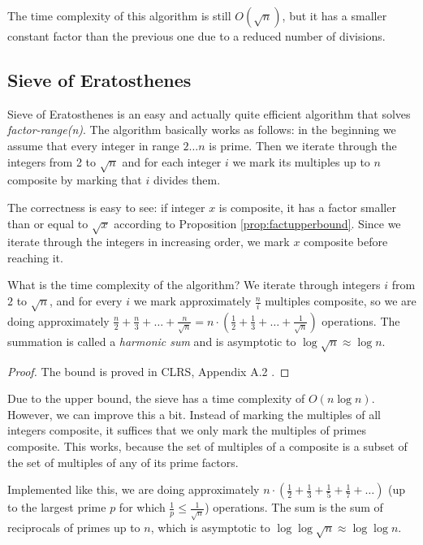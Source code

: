\documentclass[12pt] {article}
\theoremstyle{plain}
\theoremstyle{definition}
\begin{document}
The time complexity of this algorithm is still $O(\sqrt{n})$, but it has a smaller constant factor than the previous one due to a reduced number of divisions.

\subsection {Sieve of Eratosthenes}

Sieve of Eratosthenes is an easy and actually quite efficient algorithm that solves \textit{factor-range(n)}. The algorithm basically works as follows: in the beginning we assume that every integer in range $2 \dots n$ is prime. Then we iterate through the integers from 2 to $\sqrt{n}$ and for each integer $i$ we mark its multiples up to $n$ composite by marking that $i$ divides them.

The correctness is easy to see: if integer $x$ is composite, it has a factor smaller than or equal to $\sqrt{x}$ according to Proposition \ref{prop:factupperbound}. Since we iterate through the integers in increasing order, we mark $x$ composite before reaching it.

What is the time complexity of the algorithm? We iterate through integers $i$ from $2$ to $\sqrt{n}$, and for every $i$ we mark approximately $\frac{n}{i}$ multiples composite, so we are doing approximately $\frac{n}{2} + \frac{n}{3} + \dots + \frac{n}{\sqrt{n}} = n \cdot (\frac{1}{2} + \frac{1}{3} + \dots + \frac{1}{\sqrt{n}})$ operations. The summation is called a \textit{harmonic sum} and is asymptotic to $\log{\sqrt{n}} \approx \log{n}$.

\begin{proof}
The bound is proved in CLRS, Appendix A.2 \cite{clrs}.
\end{proof}

Due to the upper bound, the sieve has a time complexity of $O(n \log n)$. However, we can improve this a bit. Instead of marking the multiples of all integers composite, it suffices that we only mark the multiples of primes composite. This works, because the set of multiples of a composite is a subset of the set of multiples of any of its prime factors. 

Implemented like this, we are doing approximately $n \cdot (\frac{1}{2} + \frac{1}{3} + \frac{1}{5} + \frac{1}{7} + \dots)$ (up to the largest prime $p$ for which  $\frac{1}{p} \leq \frac{1}{\sqrt{n}}$) operations. The sum is the sum of reciprocals of primes up to $n$, which is asymptotic to $\log{\log{\sqrt{n}}} \approx \log{\log{n}}$.
\end{document}
